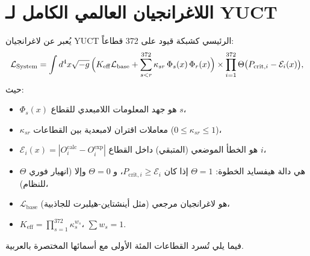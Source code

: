 \documentclass[11pt,a4paper]{article}
\begin{document}
	\section{اللاغرانجيان العالمي الكامل لـ YUCT}
	يُعبر عن لاغرانجيان YUCT الرئيسي كشبكة قيود على 372 قطاعاً:
	\begin{equation}
		\mathcal{L}_{\text{System}} = \int d^4x\sqrt{-g}\,
		\Bigl( K_{\mathrm{eff}} \mathcal{L}_{\text{base}}
		+ \sum_{s<r}^{372} \kappa_{sr}\, \Phi_s(x)\, \Phi_r(x) \Bigr)
		\times \prod_{i=1}^{372} \Theta\bigl( P_{\text{crit},i} - \mathcal{E}_i(x) \bigr),
	\end{equation}
	حيث:
	\begin{itemize}
		\item $\Phi_s(x)$ هو جهد المعلومات اللامبعدي للقطاع $s$،
		\item $\kappa_{sr}$ معاملات اقتران لامبعدية بين القطاعات ($0 \le \kappa_{sr} \le 1$)،
		\item $\mathcal{E}_i(x) = |O_i^{\text{calc}} - O_i^{\text{exp}}|$ هو الخطأ الموضعي (المتبقي) داخل القطاع $i$،
		\item $\Theta$ هي دالة هيفسايد الخطوة: $\Theta = 1$ إذا كان $P_{\text{crit},i} \ge \mathcal{E}_i$، و $\Theta = 0$ وإلا (انهيار فوري للنظام)،
		\item $\mathcal{L}_{\text{base}}$ هو لاغرانجيان مرجعي (مثل أينشتاين-هيلبرت للجاذبية)،
		\item $K_{\mathrm{eff}} = \prod_{s=1}^{372} \kappa_s^{w_s}$، $\sum w_s = 1$.
	\end{itemize}
	فيما يلي تُسرد القطاعات المئة الأولى مع أسمائها المختصرة بالعربية.
	\scriptsize
\end{document}

